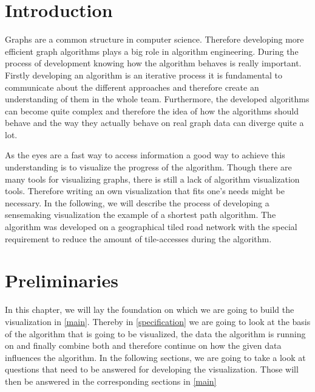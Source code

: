 \documentclass
[
	paper = a4,
    pagesize,
	12 pt,
	oneside,                       %
    open = right,
	DIV = calc,
	BCOR = 0 mm,                   %
	bibtotoc
]
{scrbook}
\begin{document}
\frontmatter







\mainmatter
\chapter{Introduction} \label{introduction}
Graphs are a common structure in computer science.
Therefore developing more efficient graph algorithms plays a big role in algorithm engineering.
During the process of development knowing how the algorithm behaves is really important.
Firstly developing an algorithm is an iterative process it is fundamental to communicate about the different approaches and therefore create an understanding of them in the whole team.
Furthermore, the developed algorithms can become quite complex and therefore the idea of how the algorithms should behave and the way they actually behave on real graph data can diverge quite a lot.
\par
As the eyes are a fast way to access information a good way to achieve this understanding is to visualize the progress of the algorithm.
Though there are many tools for visualizing graphs, there is still a lack of algorithm visualization tools.
Therefore writing an own visualization that fits one's needs might be necessary.
In the following, we will describe the process of developing a sensemaking visualization the example of a shortest path algorithm. The algorithm was developed on a geographical tiled road network with the special requirement to reduce the amount of tile-accesses during the algorithm.


\chapter{Preliminaries} \label{questions}

In this chapter, we will lay the foundation on which we are going to build the visualization in \cref{main}.
\newline Thereby in \cref{specification} we are going to look at the basis of the algorithm that is going to be visualized, the data the algorithm is running on and finally combine both and therefore continue on how the given data influences the algorithm.
In the following sections, we are going to take a look at questions that need to be answered for developing the visualization.
Those will then be answered in the corresponding sections in \cref{main}
\end{document}
